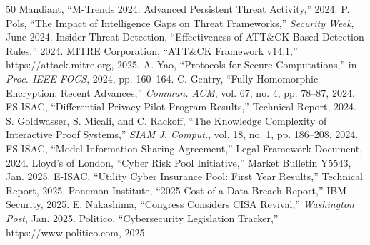 \documentclass[journal]{IEEEtran}
\begin{document}
\begin{thebibliography}{50}
 Mandiant, ``M-Trends 2024: Advanced Persistent Threat Activity,'' 2024.
 P. Pols, ``The Impact of Intelligence Gaps on Threat Frameworks,'' \emph{Security Week}, June 2024.
 Insider Threat Detection, ``Effectiveness of ATT\&CK-Based Detection Rules,'' 2024.
 MITRE Corporation, ``ATT\&CK Framework v14.1,'' https://attack.mitre.org, 2025.
 A. Yao, ``Protocols for Secure Computations,'' in \emph{Proc. IEEE FOCS}, 2024, pp. 160--164.
 C. Gentry, ``Fully Homomorphic Encryption: Recent Advances,'' \emph{Commun. ACM}, vol. 67, no. 4, pp. 78--87, 2024.
 FS-ISAC, ``Differential Privacy Pilot Program Results,'' Technical Report, 2024.
 S. Goldwasser, S. Micali, and C. Rackoff, ``The Knowledge Complexity of Interactive Proof Systems,'' \emph{SIAM J. Comput.}, vol. 18, no. 1, pp. 186--208, 2024.
 FS-ISAC, ``Model Information Sharing Agreement,'' Legal Framework Document, 2024.
 Lloyd's of London, ``Cyber Risk Pool Initiative,'' Market Bulletin Y5543, Jan. 2025.
 E-ISAC, ``Utility Cyber Insurance Pool: First Year Results,'' Technical Report, 2025.
 Ponemon Institute, ``2025 Cost of a Data Breach Report,'' IBM Security, 2025.
 E. Nakashima, ``Congress Considers CISA Revival,'' \emph{Washington Post}, Jan. 2025.
 Politico, ``Cybersecurity Legislation Tracker,'' https://www.politico.com, 2025.

\end{thebibliography}
\end{document}
